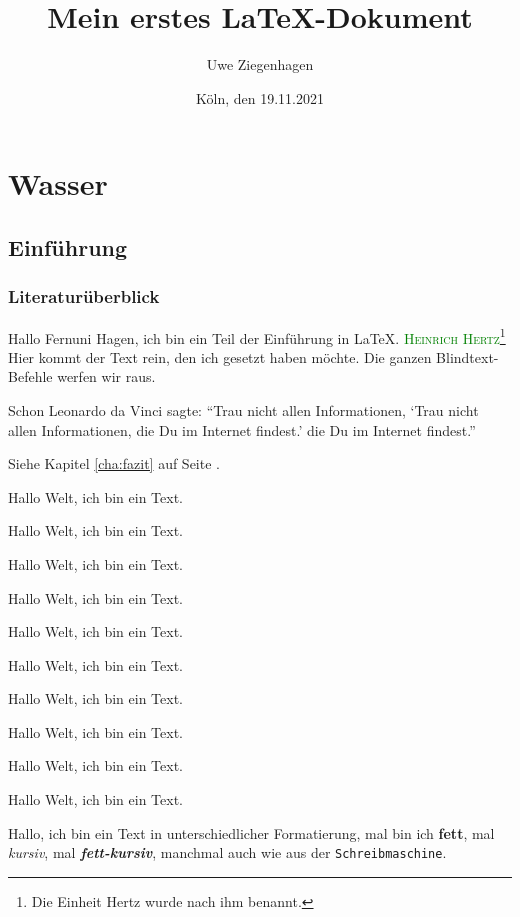 \documentclass[12pt,ngerman,parskip=full]{scrreprt}
\author{Uwe Ziegenhagen}
\title{Mein erstes \LaTeX-Dokument}
\date{Köln, den 19.11.2021}
\newcommand{\person}[1]{\textsc{\textcolor{green}{#1}}}
\begin{document}
\maketitle

\tableofcontents

\listoffigures

\chapter{Wasser}

\section{Einführung}
\subsection{Literaturüberblick}

Hallo Fernuni Hagen, ich bin ein Teil der Einführung in \LaTeX. \person{Heinrich Hertz}\footnote{Die Einheit Hertz wurde nach ihm benannt.}
Hier kommt der Text rein, den ich gesetzt haben möchte. 
Die ganzen Blindtext-Befehle werfen wir raus. 

Schon Leonardo da Vinci sagte: \enquote{Trau nicht allen Informationen, \enquote{Trau nicht allen Informationen, die Du im Internet findest.} die Du im Internet findest.}

Siehe Kapitel \ref{cha:fazit} auf Seite \pageref{cha:fazit}.

{\tiny Hallo Welt, ich bin ein Text.}

{\scriptsize Hallo Welt, ich bin ein Text.}

{\footnotesize Hallo Welt, ich bin ein Text.}

{\small Hallo Welt, ich bin ein Text.}

{\normalsize Hallo Welt, ich bin ein Text.}

{\large Hallo Welt, ich bin ein Text.}

{\Large Hallo Welt, ich bin ein Text.}

{\LARGE Hallo Welt, ich bin ein Text.}

{\huge Hallo Welt, ich bin ein Text.}

{\Huge Hallo Welt, ich bin ein Text.}

Hallo, ich bin ein Text in unterschiedlicher Formatierung, mal bin ich \textbf{fett}, mal \textit{kursiv}, mal \textbf{\textit{fett-kursiv}}, manchmal auch wie aus der \texttt{Schreibmaschine}. 
\end{document}
